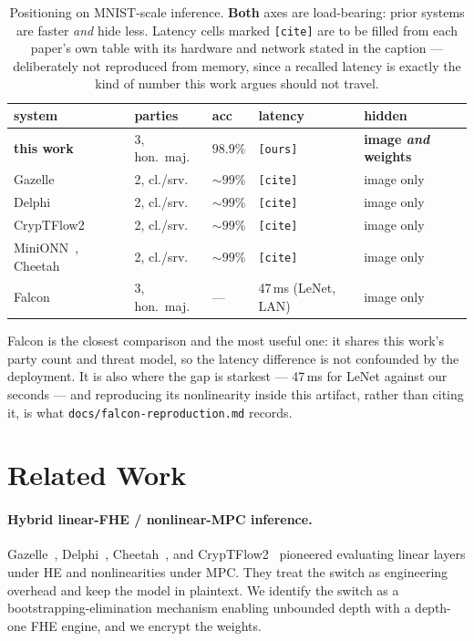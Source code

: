 \documentclass[11pt]{article}
\theoremstyle{plain}
\theoremstyle{definition}
\theoremstyle{remark}
\begin{document}
\begin{table}[t]
\centering
\caption{Positioning on MNIST-scale inference. \textbf{Both} axes are load-bearing:
prior systems are faster \emph{and} hide less. Latency cells marked
\texttt{[cite]} are to be filled from each paper's own table with its hardware and
network stated in the caption --- deliberately not reproduced from memory, since a
recalled latency is exactly the kind of number this work argues should not travel.}
\label{tab:sota}
\small
\begin{tabular}{@{}lllll@{}}
\toprule
system & parties & acc & latency & hidden \\
\midrule
\textbf{this work} & 3, hon.\ maj. & $\mathbf{98.9\%}$ & \texttt{[ours]} & \textbf{image \emph{and} weights} \\
Gazelle~\cite{Gazelle} & 2, cl./srv. & ${\sim}99\%$ & \texttt{[cite]} & image only \\
Delphi~\cite{Delphi} & 2, cl./srv. & ${\sim}99\%$ & \texttt{[cite]} & image only \\
CrypTFlow2~\cite{CrypTFlow2} & 2, cl./srv. & ${\sim}99\%$ & \texttt{[cite]} & image only \\
MiniONN~\cite{MiniONN}, Cheetah~\cite{Cheetah} & 2, cl./srv. & ${\sim}99\%$ & \texttt{[cite]} & image only \\
Falcon~\cite{Falcon} & 3, hon.\ maj. & --- & 47\,ms (LeNet, LAN) & image only \\
\bottomrule
\end{tabular}
\end{table}

Falcon is the closest comparison and the most useful one: it shares this work's
party count and threat model, so the latency difference is not confounded by the
deployment. It is also where the gap is starkest --- 47\,ms for LeNet against our seconds ---
and reproducing its nonlinearity inside this artifact, rather than citing it, is
what \texttt{docs/falcon-reproduction.md} records.

\section{Related Work}\label{sec:related}

\paragraph{Hybrid linear-FHE / nonlinear-MPC inference.}
Gazelle~\cite{Gazelle}, Delphi~\cite{Delphi}, Cheetah~\cite{Cheetah}, and
CrypTFlow2~\cite{CrypTFlow2} pioneered evaluating linear layers under
HE and nonlinearities under MPC. They treat the switch as engineering
overhead and keep the model in plaintext. We identify the switch as a
bootstrapping-elimination mechanism enabling unbounded depth with a
depth-one FHE engine, and we encrypt the weights.
\end{document}
